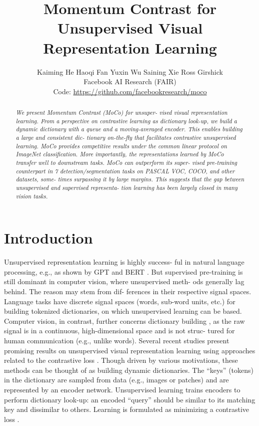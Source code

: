 \documentclass[10pt,twocolumn]{article}  %
\date{}  %
\title{Momentum Contrast for Unsupervised Visual Representation Learning}
\author{Kaiming He    Haoqi Fan    Yuxin Wu    Saining Xie    Ross Girshick \\
Facebook AI Research (FAIR) \\
Code: \href{https://github.com/facebookresearch/moco}{\color{myPink}https://github.com/facebookresearch/moco}
}
\begin{document}
\maketitle

\begin{abstract}
    \fontsize{10pt}{12pt}\selectfont %
    \noindent %
    \itshape \hspace{1em} We present Momentum Contrast (MoCo) for unsuper-
    vised visual representation learning. From a perspective on
    contrastive learning \cite{29_hadsell2006dimensionality} as dictionary look-up, we build
    a dynamic dictionary with a queue and a moving-averaged
    encoder. This enables building a large and consistent dic-
    tionary on-the-ﬂy that facilitates contrastive unsupervised
    learning. MoCo provides competitive results under the
    common linear protocol on ImageNet classiﬁcation. More
    importantly, the representations learned by MoCo transfer
    well to downstream tasks. MoCo can outperform its super-
    vised pre-training counterpart in 7 detection/segmentation
    tasks on PASCAL VOC, COCO, and other datasets, some-
    times surpassing it by large margins. This suggests that
    the gap between unsupervised and supervised representa-
    tion learning has been largely closed in many vision tasks.
\end{abstract}

\section{Introduction}
Unsupervised representation learning is highly success-
ful in natural language processing, e.g., as shown by GPT
\cite{50_radford2018improving, 51_radford2019language} and BERT \cite{12_devlin2019bert}. But supervised pre-training is still
dominant in computer vision, where unsupervised meth-
ods generally lag behind. The reason may stem from dif-
ferences in their respective signal spaces. Language tasks
have discrete signal spaces (words, sub-word units, etc.)
for building tokenized dictionaries, on which unsupervised
learning can be based. Computer vision, in contrast, further
concerns dictionary building \cite{54_sivic2003video, 9_coates2011importance, 5_chatfield2011devil}, as the raw signal is
in a continuous, high-dimensional space and is not struc-
tured for human communication (e.g., unlike words).
Several recent studies \cite{61_wu2018unsupervised, 46_oord2018representation, 36_hjelm2019learning, 66_zhuang2019local, 35_henaff2019data, 56_tian2019contrastive, 2_bachman2019learning}
present promising results on unsupervised visual representation
learning using approaches related to the contrastive loss
\cite{29_hadsell2006dimensionality}. Though driven by various motivations, these methods
can be thought of as building dynamic dictionaries. The
“keys” (tokens) in the dictionary are sampled from data
(e.g., images or patches) and are represented by an encoder
network. Unsupervised learning trains encoders to perform
dictionary look-up: an encoded “query” should be similar
to its matching key and dissimilar to others. Learning is
formulated as minimizing a contrastive loss \cite{29_hadsell2006dimensionality}.
\end{document}
